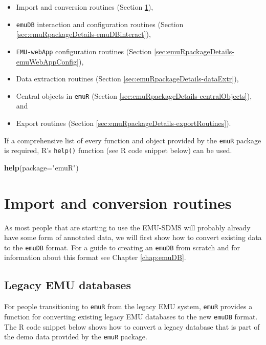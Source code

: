 \documentclass[]{book}
\newenvironment{Shaded}{\begin{snugshade}}{\end{snugshade}}
\newcommand{\DataTypeTok}[1]{\textcolor[rgb]{0.13,0.29,0.53}{#1}}
\newcommand{\KeywordTok}[1]{\textcolor[rgb]{0.13,0.29,0.53}{\textbf{#1}}}
\newcommand{\NormalTok}[1]{#1}
\newcommand{\StringTok}[1]{\textcolor[rgb]{0.31,0.60,0.02}{#1}}
\providecommand{\tightlist}{%
  \setlength{\itemsep}{0pt}\setlength{\parskip}{0pt}}
\begin{document}
\begin{itemize}
\tightlist
\item
  Import and conversion routines (Section \ref{sec:emuRpackageDetails-importRoutines}),
\item
  \texttt{emuDB} interaction and configuration routines (Section \ref{sec:emuRpackageDetails-emuDBinteract}),
\item
  \texttt{EMU-webApp} configuration routines (Section \ref{sec:emuRpackageDetails-emuWebAppConfig}),
\item
  Data extraction routines (Section \ref{sec:emuRpackageDetails-dataExtr}),
\item
  Central objects in \texttt{emuR} (Section \ref{sec:emuRpackageDetails-centralObjects}), and
\item
  Export routines (Section \ref{sec:emuRpackageDetails-exportRoutines}).
\end{itemize}

If a comprehensive list of every function and object provided by the \texttt{emuR} package is required, R's \texttt{help()} function (see R code snippet below) can be used.

\begin{Shaded}
\begin{Highlighting}[]
\KeywordTok{help}\NormalTok{(}\DataTypeTok{package=}\StringTok{"emuR"}\NormalTok{)}
\end{Highlighting}
\end{Shaded}

\hypertarget{sec:emuRpackageDetails-importRoutines}{%
\section{Import and conversion routines}\label{sec:emuRpackageDetails-importRoutines}}

As most people that are starting to use the EMU-SDMS will probably already have some form of annotated data, we will first show how to convert existing data to the \texttt{emuDB} format. For a guide to creating an \texttt{emuDB} from scratch and for information about this format see Chapter \ref{chap:emuDB}.

\hypertarget{legacy-emu-databases}{%
\subsection{Legacy EMU databases}\label{legacy-emu-databases}}

For people transitioning to \texttt{emuR} from the legacy EMU system, \texttt{emuR} provides a function for converting existing legacy EMU databases to the new \texttt{emuDB} format. The R code snippet below shows how to convert a legacy database that is part of the demo data provided by the \texttt{emuR} package.
\end{document}
